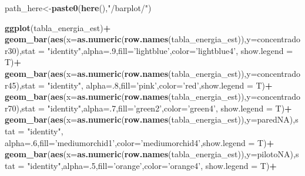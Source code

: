 \documentclass[]{article}
\newenvironment{Shaded}{\begin{snugshade}}{\end{snugshade}}
\newcommand{\KeywordTok}[1]{\textcolor[rgb]{0.13,0.29,0.53}{\textbf{#1}}}
\newcommand{\DataTypeTok}[1]{\textcolor[rgb]{0.13,0.29,0.53}{#1}}
\newcommand{\DecValTok}[1]{\textcolor[rgb]{0.00,0.00,0.81}{#1}}
\newcommand{\StringTok}[1]{\textcolor[rgb]{0.31,0.60,0.02}{#1}}
\newcommand{\OperatorTok}[1]{\textcolor[rgb]{0.81,0.36,0.00}{\textbf{#1}}}
\newcommand{\NormalTok}[1]{#1}
\begin{document}
\begin{Shaded}
\begin{Highlighting}[]
{{{{{{\NormalTok{  path_here<-}\KeywordTok{paste0}\NormalTok{(}\KeywordTok{here}\NormalTok{(),}\StringTok{"/barplot/"}\NormalTok{)}
  
  
  
  
  \KeywordTok{ggplot}\NormalTok{(tabla_energia_est)}\OperatorTok{+}
\StringTok{    }\KeywordTok{geom_bar}\NormalTok{(}\KeywordTok{aes}\NormalTok{(}\DataTypeTok{x=}\KeywordTok{as.numeric}\NormalTok{(}\KeywordTok{row.names}\NormalTok{(tabla_energia_est)),}\DataTypeTok{y=}\NormalTok{concentrador30),}\DataTypeTok{stat =} \StringTok{"identity"}\NormalTok{,}\DataTypeTok{alpha=}\NormalTok{.}\DecValTok{9}\NormalTok{,}\DataTypeTok{fill=}\StringTok{'lightblue'}\NormalTok{,}\DataTypeTok{color=}\StringTok{'lightblue4'}\NormalTok{, }\DataTypeTok{show.legend =}\NormalTok{ T)}\OperatorTok{+}
\StringTok{    }\KeywordTok{geom_bar}\NormalTok{(}\KeywordTok{aes}\NormalTok{(}\DataTypeTok{x=}\KeywordTok{as.numeric}\NormalTok{(}\KeywordTok{row.names}\NormalTok{(tabla_energia_est)),}\DataTypeTok{y=}\NormalTok{concentrador45),}\DataTypeTok{stat =} \StringTok{"identity"}\NormalTok{, }\DataTypeTok{alpha=}\NormalTok{.}\DecValTok{8}\NormalTok{,}\DataTypeTok{fill=}\StringTok{'pink'}\NormalTok{,}\DataTypeTok{color=}\StringTok{'red'}\NormalTok{,}\DataTypeTok{show.legend =}\NormalTok{ T)}\OperatorTok{+}
\StringTok{    }\KeywordTok{geom_bar}\NormalTok{(}\KeywordTok{aes}\NormalTok{(}\DataTypeTok{x=}\KeywordTok{as.numeric}\NormalTok{(}\KeywordTok{row.names}\NormalTok{(tabla_energia_est)),}\DataTypeTok{y=}\NormalTok{concentrador70),}\DataTypeTok{stat =} \StringTok{"identity"}\NormalTok{,}\DataTypeTok{alpha=}\NormalTok{.}\DecValTok{7}\NormalTok{,}\DataTypeTok{fill=}\StringTok{'green2'}\NormalTok{,}\DataTypeTok{color=}\StringTok{'green4'}\NormalTok{, }\DataTypeTok{show.legend =}\NormalTok{ T)}\OperatorTok{+}
\StringTok{    }\KeywordTok{geom_bar}\NormalTok{(}\KeywordTok{aes}\NormalTok{(}\DataTypeTok{x=}\KeywordTok{as.numeric}\NormalTok{(}\KeywordTok{row.names}\NormalTok{(tabla_energia_est)),}\DataTypeTok{y=}\NormalTok{paredNA),}\DataTypeTok{stat =} \StringTok{"identity"}\NormalTok{, }\DataTypeTok{alpha=}\NormalTok{.}\DecValTok{6}\NormalTok{,}\DataTypeTok{fill=}\StringTok{'mediumorchid1'}\NormalTok{,}\DataTypeTok{color=}\StringTok{'mediumorchid4'}\NormalTok{,}\DataTypeTok{show.legend =}\NormalTok{ T)}\OperatorTok{+}
\StringTok{    }\KeywordTok{geom_bar}\NormalTok{(}\KeywordTok{aes}\NormalTok{(}\DataTypeTok{x=}\KeywordTok{as.numeric}\NormalTok{(}\KeywordTok{row.names}\NormalTok{(tabla_energia_est)),}\DataTypeTok{y=}\NormalTok{pilotoNA),}\DataTypeTok{stat =} \StringTok{"identity"}\NormalTok{,}\DataTypeTok{alpha=}\NormalTok{.}\DecValTok{5}\NormalTok{,}\DataTypeTok{fill=}\StringTok{'orange'}\NormalTok{,}\DataTypeTok{color=}\StringTok{'orange4'}\NormalTok{, }\DataTypeTok{show.legend =}\NormalTok{ T)}\OperatorTok{+}
}}}}}}
\end{Highlighting}
\end{Shaded}
\end{document}
